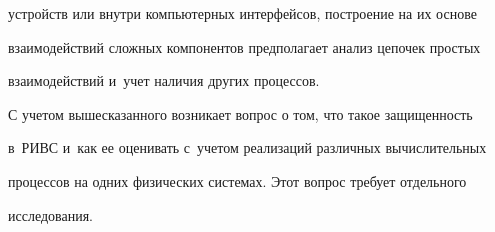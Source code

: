 устройств или внутри компьютерных интерфейсов, построение на их основе 


взаимодействий сложных компонентов предполагает анализ цепочек простых 


взаимодействий и~учет наличия других процессов. 


  


  С учетом вышесказанного возникает вопрос о том, что такое защищенность 


в~РИВС и~как ее оценивать с~учетом реализаций различных вычислительных 


процессов на одних физических системах. Этот вопрос требует отдельного 


исследования.







  



